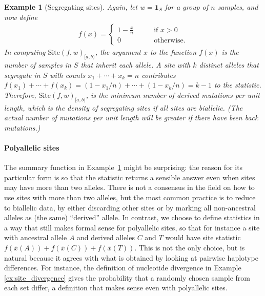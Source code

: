 \documentclass[9pt,twoside,lineno]{gsajnl}
\newcommand{\bone}{\mathbf{1}}
\newtheorem{example}{Example}
\newcommand{\site}{\mbox{Site}} %
\newcommand{\iw}{w} %
\newcommand{\aw}{{\bar x}} %
\begin{document}
\begin{example}[Segregating sites] \label{ex:segregating_sites}
    Again, let $\iw = \bone_{S}$ for a group of $n$ samples,
    and now define
    \begin{align*}
        f(x) = \begin{cases}
            1 - \frac{x}{n} \qquad &\text{if } x > 0 \\
            0 \qquad &\text{otherwise} .
        \end{cases}
    \end{align*}
    In computing $\site(f, \iw)_{[a,b)}$, the argument $x$ to the function $f(x)$
    is the number of samples in $S$ that inherit each allele.
    A site with $k$ distinct alleles that segregate in $S$ with counts $x_1 + \cdots + x_k = n$
    contributes $f(x_1) + \cdots + f(x_k) = (1 - x_1/n) + \cdots + (1 - x_k/n) = k - 1$
    to the statistic.
    Therefore, $\site(f, \iw)_{[a,b)}$, is the minimum number of derived mutations per unit length,
    which is the density of segregating sites if all sites are biallelic.
    (The actual number of mutations per unit length will be greater if there have been back mutations.)
\end{example}

\paragraph{Polyallelic sites}
The summary function in Example~\ref{ex:segregating_sites} might be surprising:
the reason for its particular form is so that the statistic returns a sensible answer
even when sites may have more than two alleles.
There is not a consensus in the field
on how to use sites with more than two alleles, but the most common practice is
to reduce to biallelic data, by either discarding other sites
or by marking all non-ancestral alleles as (the same) ``derived'' allele.
In contrast, we choose to define statistics in a way that still makes formal sense for polyallelic sites,
so that for instance a site with ancestral allele $A$ and derived alleles $C$ and $T$
would have site statistic $f(\aw(A)) + f(\aw(C)) + f(\aw(T))$.
This is not the only choice, but is natural because it agrees with what is obtained by
looking at pairwise haplotype differences.
For instance, the definition of nucleotide divergence in Example \ref{ex:site_divergence}
gives the probability that a randomly chosen sample from each set differ,
a definition that makes sense even with polyallelic sites.
\end{document}
